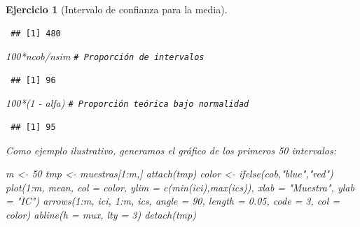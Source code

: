 \documentclass[
]{book}
\newenvironment{Shaded}{\begin{snugshade}}{\end{snugshade}}
\newcommand{\AttributeTok}[1]{\textcolor[rgb]{0.77,0.63,0.00}{#1}}
\newcommand{\CommentTok}[1]{\textcolor[rgb]{0.56,0.35,0.01}{\textit{#1}}}
\newcommand{\DecValTok}[1]{\textcolor[rgb]{0.00,0.00,0.81}{#1}}
\newcommand{\FloatTok}[1]{\textcolor[rgb]{0.00,0.00,0.81}{#1}}
\newcommand{\FunctionTok}[1]{\textcolor[rgb]{0.00,0.00,0.00}{#1}}
\newcommand{\NormalTok}[1]{#1}
\newcommand{\OtherTok}[1]{\textcolor[rgb]{0.56,0.35,0.01}{#1}}
\newcommand{\SpecialCharTok}[1]{\textcolor[rgb]{0.00,0.00,0.00}{#1}}
\newcommand{\StringTok}[1]{\textcolor[rgb]{0.31,0.60,0.02}{#1}}
\theoremstyle{break}
\newtheorem{exercise}{Ejercicio}[chapter]
\theoremstyle{nonumberplain}
\renewcommand{\CommentTok}[1]{\textcolor[rgb]{0.41,0.41,0.41}{\texttt{#1}}}
\begin{document}
\begin{exercise}[Intervalo de confianza para la media]
\begin{enumerate}
\begin{verbatim}
 ## [1] 480
\end{verbatim}

\begin{Shaded}
\begin{Highlighting}[]
\DecValTok{100}\SpecialCharTok{*}\NormalTok{ncob}\SpecialCharTok{/}\NormalTok{nsim     }\CommentTok{\# Proporción de intervalos}
\end{Highlighting}
\end{Shaded}

\begin{verbatim}
 ## [1] 96
\end{verbatim}

\begin{Shaded}
\begin{Highlighting}[]
\DecValTok{100}\SpecialCharTok{*}\NormalTok{(}\DecValTok{1} \SpecialCharTok{{-}}\NormalTok{ alfa)    }\CommentTok{\# Proporción teórica bajo normalidad}
\end{Highlighting}
\end{Shaded}

\begin{verbatim}
 ## [1] 95
\end{verbatim}

  Como ejemplo ilustrativo, generamos el gráfico de los primeros 50 intervalos:

\begin{Shaded}
\begin{Highlighting}[]
\NormalTok{m }\OtherTok{\textless{}{-}} \DecValTok{50}
\NormalTok{tmp }\OtherTok{\textless{}{-}}\NormalTok{ muestras[}\DecValTok{1}\SpecialCharTok{:}\NormalTok{m,]}
\FunctionTok{attach}\NormalTok{(tmp)}
\NormalTok{color }\OtherTok{\textless{}{-}} \FunctionTok{ifelse}\NormalTok{(cob,}\StringTok{"blue"}\NormalTok{,}\StringTok{"red"}\NormalTok{)}
\FunctionTok{plot}\NormalTok{(}\DecValTok{1}\SpecialCharTok{:}\NormalTok{m, mean, }\AttributeTok{col =}\NormalTok{ color, }\AttributeTok{ylim =} \FunctionTok{c}\NormalTok{(}\FunctionTok{min}\NormalTok{(ici),}\FunctionTok{max}\NormalTok{(ics)), }
     \AttributeTok{xlab =} \StringTok{"Muestra"}\NormalTok{, }\AttributeTok{ylab =} \StringTok{"IC"}\NormalTok{)}
\FunctionTok{arrows}\NormalTok{(}\DecValTok{1}\SpecialCharTok{:}\NormalTok{m, ici, }\DecValTok{1}\SpecialCharTok{:}\NormalTok{m, ics, }\AttributeTok{angle =} \DecValTok{90}\NormalTok{, }\AttributeTok{length =} \FloatTok{0.05}\NormalTok{, }\AttributeTok{code =} \DecValTok{3}\NormalTok{, }\AttributeTok{col =}\NormalTok{ color)}
\FunctionTok{abline}\NormalTok{(}\AttributeTok{h =}\NormalTok{ mux, }\AttributeTok{lty =} \DecValTok{3}\NormalTok{)}
\FunctionTok{detach}\NormalTok{(tmp)}
\end{Highlighting}
\end{Shaded}


\end{enumerate}
\end{exercise}
\end{document}
